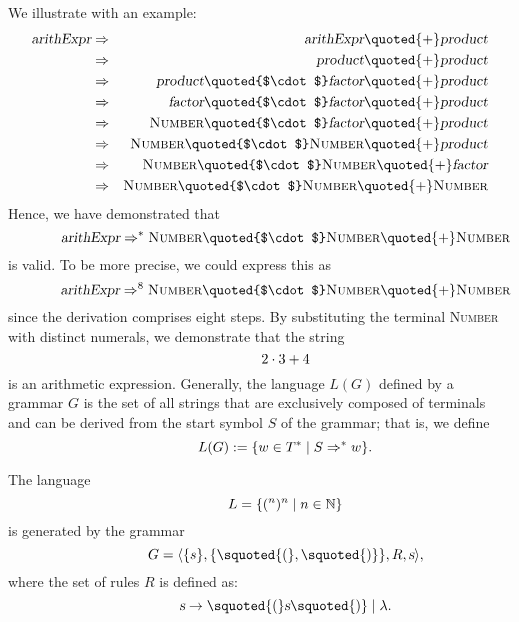 We illustrate with an example:
\begin{eqnarray*}
\textsl{arithExpr} 
& \Rightarrow & \textsl{arithExpr} \quoted{+} \textsl{product}  \\
& \Rightarrow & \textsl{product} \quoted{+} \textsl{product}  \\
& \Rightarrow & \textsl{product} \quoted{$\cdot$} \textsl{factor} \quoted{+} \textsl{product} \\
& \Rightarrow & \textsl{factor} \quoted{$\cdot$} \textsl{factor} \quoted{+} \textsl{product}  \\
& \Rightarrow & \textsc{Number} \quoted{$\cdot$} \textsl{factor} \quoted{+} \textsl{product}  \\
& \Rightarrow & \textsc{Number} \quoted{$\cdot$} \textsc{Number} \quoted{+} \textsl{product}  \\
& \Rightarrow & \textsc{Number} \quoted{$\cdot$} \textsc{Number} \quoted{+} \textsl{factor}   \\
& \Rightarrow & \textsc{Number} \quoted{$\cdot$} \textsc{Number} \quoted{+} \textsc{Number}   
\end{eqnarray*}
Hence, we have demonstrated that
\[
\hspace*{1.3cm}
\textsl{arithExpr} \Rightarrow^* \textsc{Number} \quoted{$\cdot$} \textsc{Number} \quoted{+} \textsc{Number}
\]
is valid. To be more precise, we could express this as
\[
\hspace*{1.3cm}
\textsl{arithExpr} \Rightarrow^8 \textsc{Number} \quoted{$\cdot$} \textsc{Number} \quoted{+} \textsc{Number}
\]
since the derivation comprises eight steps. By substituting the terminal \textsc{Number} with distinct numerals, we demonstrate that the string
\[
\hspace*{1.3cm}
2 \cdot 3 + 4
\]
is an arithmetic expression. Generally, the language \( L(G) \) defined by a grammar \( G \) is the set of all
strings that are exclusively composed of terminals and can be derived from the start symbol \( S \) of the
grammar; that is, we define
\[
\hspace*{1.3cm}
L(G) := \{ w \in T^* \mid S \Rightarrow^* w \}.
\]


\exampleEng
The language
\[
\hspace*{1.3cm}
L = \{ (^n )^n \mid n \in \mathbb{N} \}
\]
is generated by the grammar
\[
\hspace*{1.3cm}
G = \langle \{s\}, \{ \squoted{(}, \squoted{)} \}, R, \textsl{s} \rangle,
\]
where the set of rules \( R \) is defined as:
\[
\hspace*{1.3cm}
\textsl{s} \rightarrow \squoted{(} \textsl{s} \squoted{)} \mid \lambda.
\]


